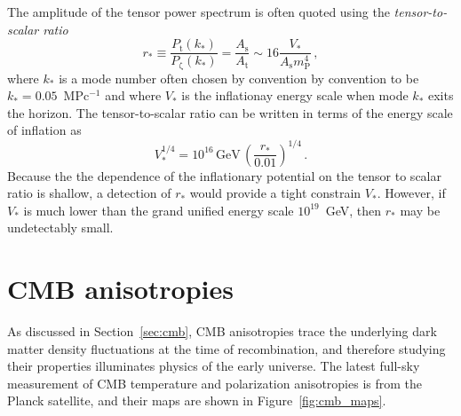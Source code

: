The amplitude of the tensor power spectrum is often quoted using the \textit{tensor-to-scalar ratio}
\begin{equation}
    r_{*} \equiv \frac{P_{\mathrm{t}}(k_{*})}{P_{\mathrm{\zeta}}(k_{*})} = \frac{A_{\mathrm{s}}}{A_{\mathrm{t}}} \sim 16 \frac{V_{*}}{A_{\mathrm{s}} m_{\mathrm{P}}^{4}} \, ,
    \label{eq:tensor_to_scalar_ratio}
\end{equation}
where $k_{*}$ is a mode number often chosen by convention by convention to be $k_{*} = 0.05$~$\mathrm{MPc^{-1}}$ and where $V_{*}$ is the inflationay energy scale when mode $k_{*}$ exits the horizon. The tensor-to-scalar ratio can be written in terms of the energy scale of inflation as
\begin{equation}
    V_{*}^{1/4} = 10^{16} \, \mathrm{GeV} \, \left( \frac{r_{*}}{0.01} \right)^{1/4} \, .
    \label{eq:tensor_to_scalar_energy_scale}
\end{equation}
Because the the dependence of the inflationary potential on the tensor to scalar ratio is shallow, a detection of $r_{*}$ would provide a tight constrain $V_{*}$. However, if $V_{*}$ is much lower than the grand unified energy scale $10^{19}$~GeV, then $r_{*}$ may be undetectably small.


\section{CMB anisotropies}
\label{sec:anisotropies}

As discussed in Section~\ref{sec:cmb}, CMB anisotropies trace the underlying dark matter density fluctuations at the time of recombination, and therefore studying their properties illuminates physics of the early universe. The latest full-sky measurement of CMB temperature and polarization anisotropies is from the Planck satellite, and their maps are shown in Figure~\ref{fig:cmb_maps}. 

